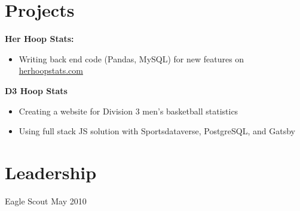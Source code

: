 \documentclass[line, margin]{res}
\begin{document}
\begin{resume}
\section{Projects}
	
	\textbf{Her Hoop Stats:}
	\begin{itemize} 
		\item Writing back end code (Pandas, MySQL) for new features on \href{https://herhoopstats.com}{herhoopstats.com}
	\end{itemize}

	\textbf{D3 Hoop Stats}
	\begin{itemize}
		\item Creating a website for Division 3 men's basketball statistics
		\item Using full stack JS solution with Sportsdataverse, PostgreSQL, and Gatsby 
	\end{itemize}

		
\section{Leadership}
	Eagle Scout \hfill {May 2010}


\end{resume}
\end{document}
